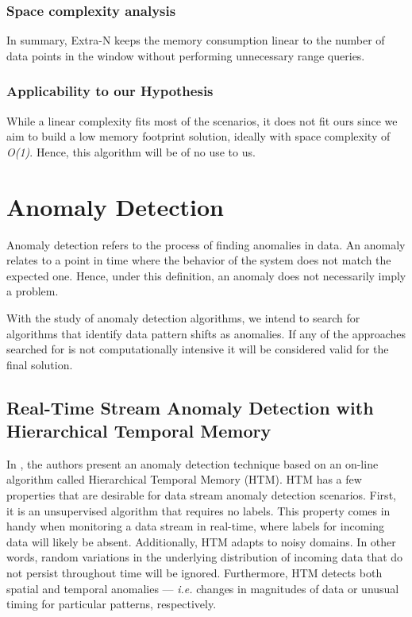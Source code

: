 \subsubsection*{Space complexity analysis}
In summary, Extra-N keeps the memory consumption linear to the number of data points in the window without performing unnecessary range queries.

\subsubsection*{Applicability to our Hypothesis}
While a linear complexity fits most of the scenarios, it does not fit ours since we aim to build a low memory footprint solution, ideally with space complexity of \textit{O(1)}. Hence, this algorithm will be of no use to us.


\section{Anomaly Detection}
Anomaly detection refers to the process of finding anomalies in data. An anomaly relates to a point in time where the behavior of the system does not match the expected one. Hence, under this definition, an anomaly does not necessarily imply a problem. 

With the study of anomaly detection algorithms, we intend to search for algorithms that identify data pattern shifts as anomalies. If any of the approaches searched for is not computationally intensive it will be considered valid for the final solution. 

\subsection{Real-Time Stream Anomaly Detection with Hierarchical Temporal Memory}

In \cite{Ahmad-HTM}, the authors present an anomaly detection technique based on an on-line algorithm called Hierarchical Temporal Memory (HTM). HTM has a few properties that are desirable for data stream anomaly detection scenarios. First, it is an unsupervised algorithm that requires no labels. This property comes in handy when monitoring a data stream in real-time, where labels for incoming data will likely be absent. Additionally, HTM adapts to noisy domains. In other words, random variations in the underlying distribution of incoming data that do not persist throughout time will be ignored. Furthermore, HTM detects both spatial and temporal anomalies --- \textit{i.e.} changes in magnitudes of data or unusual timing for particular patterns, respectively.   

